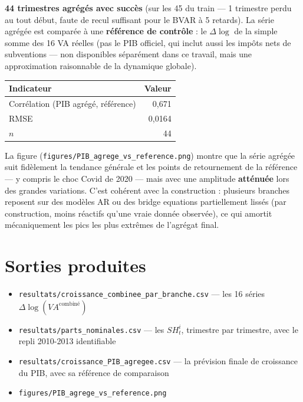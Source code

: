 \documentclass[11pt,a4paper]{article}
\begin{document}
\begin{resultatbox}
\textbf{44 trimestres agrégés avec succès} (sur les 45 du train --- 1 trimestre perdu au tout début, faute de recul suffisant pour le BVAR à 5 retards). La série agrégée est comparée à une \textbf{référence de contrôle} : le $\Delta\log$ de la simple somme des 16 VA réelles (pas le PIB officiel, qui inclut aussi les impôts nets de subventions --- non disponibles séparément dans ce travail, mais une approximation raisonnable de la dynamique globale).
\end{resultatbox}

\begin{center}
\begin{tabular}{lr}
\toprule
\textbf{Indicateur} & \textbf{Valeur} \\
\midrule
Corrélation (PIB agrégé, référence) & 0,671 \\
RMSE & 0,0164 \\
$n$ & 44 \\
\bottomrule
\end{tabular}
\end{center}

\begin{intuition}
La figure (\texttt{figures/PIB\_agrege\_vs\_reference.png}) montre que la série agrégée suit fidèlement la tendance générale et les points de retournement de la référence --- y compris le choc Covid de 2020 --- mais avec une amplitude \textbf{atténuée} lors des grandes variations. C'est cohérent avec la construction : plusieurs branches reposent sur des modèles AR ou des bridge equations partiellement lissés (par construction, moins réactifs qu'une vraie donnée observée), ce qui amortit mécaniquement les pics les plus extrêmes de l'agrégat final.
\end{intuition}

\section{Sorties produites}

\begin{resultatbox}
\begin{itemize}[leftmargin=1.3em]
\item \texttt{resultats/croissance\_combinee\_par\_branche.csv} --- les 16 séries $\Delta\log(VA^{\text{combiné}})$
\item \texttt{resultats/parts\_nominales.csv} --- les $SH_t^i$, trimestre par trimestre, avec le repli 2010-2013 identifiable
\item \texttt{resultats/croissance\_PIB\_agregee.csv} --- la prévision finale de croissance du PIB, avec sa référence de comparaison
\item \texttt{figures/PIB\_agrege\_vs\_reference.png}
\end{itemize}
\end{resultatbox}
\end{document}
